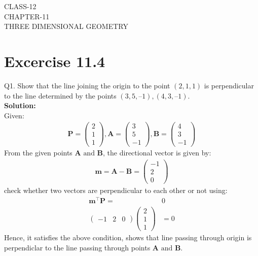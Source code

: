\documentclass[12pt]{article}
\newcommand{\solution}{\noindent \textbf{Solution: }}
\newcommand{\myvec}[1]{\ensuremath{\begin{pmatrix}#1\end{pmatrix}}}
\let\vec\mathbf
\begin{document}
\begin{center}
\textbf\large{CLASS-12 \\ CHAPTER-11 \\ THREE DIMENSIONAL GEOMETRY}
\end{center}
\section*{Excercise 11.4}

Q1. Show that the line joining the origin to the point $(2, 1, 1)$ is perpendicular to the
line determined by the points $(3, 5, – 1), (4, 3, – 1)$.
\\
\solution
\\
Given:
\begin{align}
  \vec{P}=\myvec{2\\1\\1},\vec{A}=\myvec{3\\5\\-1},\vec{B}=\myvec{4\\3\\-1}
\end{align}
From the given points $\vec{A}\text{ and }\vec{B}$, the directional vector is given by:
		\begin{align}
	\vec{m}=\vec{A}-\vec{B}=\myvec{-1\\2\\0}
		\end{align}
			 check whether two vectors are perpendicular to each other or not using:
		\begin{align}
			\vec{m}^\top\vec{P}=&0\\
			\myvec{-1&2&0}\myvec{2\\1\\1}&=0
		\end{align}
				Hence, it satisfies the above condition, shows that line passing through origin is perpendiclar to the line passing through points $\vec{A} \text{ and } \vec{B}$.
		
\end{document}
